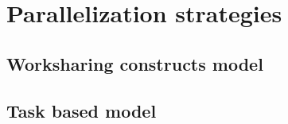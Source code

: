 \section{Parallelization strategies}



\subsection{Worksharing constructs model}


\subsection{Task based model}
